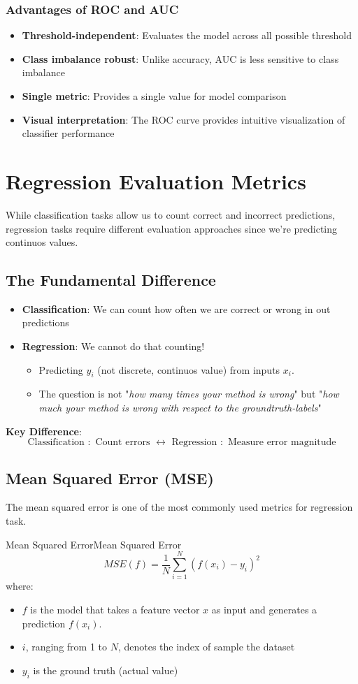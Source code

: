 \documentclass[a4paper]{article}
\theoremstyle{definition}
\begin{document}
\subsubsection{Advantages of ROC and AUC}
\begin{itemize}
    \item \textbf{Threshold-independent}: Evaluates the model across all possible threshold 
    \item \textbf{Class imbalance robust}: Unlike accuracy, AUC is less sensitive to class imbalance
    \item \textbf{Single metric}: Provides a single value for model comparison 
    \item \textbf{Visual interpretation}: The ROC curve provides intuitive visualization of classifier performance
\end{itemize}
\section{Regression Evaluation Metrics}
While classification tasks allow us to count correct and incorrect predictions, regression
tasks require different evaluation approaches since we're predicting continuos values.
\subsection{The Fundamental Difference}
\begin{itemize}
    \item \textbf{Classification}: We can count how often we are correct or wrong in out predictions 
    \item \textbf{Regression}: We cannot do that counting!
    \begin{itemize}
        \item Predicting \( y_i \) (not discrete, continuos value) from inputs \( x_i \).
        \item The question is not "\textit{how many times your method is wrong}" but "\textit{how much your method is wrong with respect to the groundtruth-labels}"
    \end{itemize}
\end{itemize}
\textbf{Key Difference}:
\[
  \text{Classification }: \text{ Count errors } \leftrightarrow \text{ Regression }: \text{ Measure error magnitude}
\]
\subsection{Mean Squared Error (MSE)}
The mean squared error is one of the most commonly used metrics for regression task.
\begin{definition}{Mean Squared Error}{Mean Squared Error}
\[
  MSE(f) = \frac{1}{N} \sum_{i = 1}^{N} (f(x_i) - y_i)^2
\]  
where:
\begin{itemize}
    \item \( f \) is the model that takes a feature vector \( x \) as input and generates a prediction \( f(x_i) \).
    \item \( i \), ranging from 1 to \( N \), denotes the index of sample the dataset 
    \item \( y_i \) is the ground truth (actual value)
\end{itemize}
\end{definition}
\end{document}
